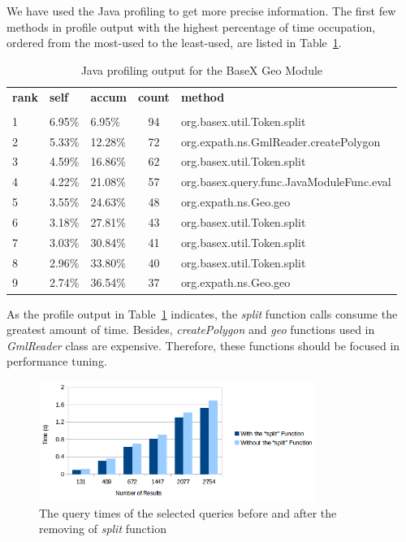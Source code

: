 \documentclass[a4paper,12pt]{article}
\begin{document}
We have used the Java profiling to get more precise information. The first few methods in profile output with the highest percentage of time occupation, ordered from the most-used to the least-used, are listed in Table~\ref{javaprofile}.
\begin{table}
\begin{tabular}{l l l c l}
\textbf{rank} & \textbf{self} & \textbf{accum} & \textbf{count} & \textbf{method} \\
 & & & &\\
1 & 6.95\% & 6.95\% & 94 & org.basex.util.Token.{\color{red}split}\\
2 & 5.33\% & 12.28\% & 72 & org.expath.ns.GmlReader.createPolygon \\
3 & 4.59\% & 16.86\% & 62 & org.basex.util.Token.{\color{red}split} \\
4 & 4.22\% & 21.08\% & 57 & org.basex.query.func.JavaModuleFunc.eval \\
5 & 3.55\% & 24.63\% & 48 & org.expath.ns.Geo.geo \\
6 & 3.18\% & 27.81\% & 43 & org.basex.util.Token.{\color{red}split} \\
7 & 3.03\% & 30.84\% & 41 & org.basex.util.Token.{\color{red}split} \\
8 & 2.96\% & 33.80\% & 40 & org.basex.util.Token.{\color{red}split} \\
9 & 2.74\% & 36.54\% & 37 & org.expath.ns.Geo.geo \\
\end{tabular}
\caption{Java profiling output for the BaseX Geo Module}
\label{javaprofile}
\end{table}
As the profile output in Table~\ref{javaprofile} indicates, the \textit{split} function calls consume the greatest amount of time. Besides, \textit{createPolygon} and \textit{geo} functions used in \textit{GmlReader} class are expensive. Therefore, these functions should be focused in performance tuning. 
\begin{figure}
\centering
\includegraphics[width=0.8\textwidth,height=0.2\textheight]{BXSplit}
\caption{The query times of the selected queries before and after the removing of \textit{split} function}
\label{figBXSplit}
\end{figure}
\end{document}
